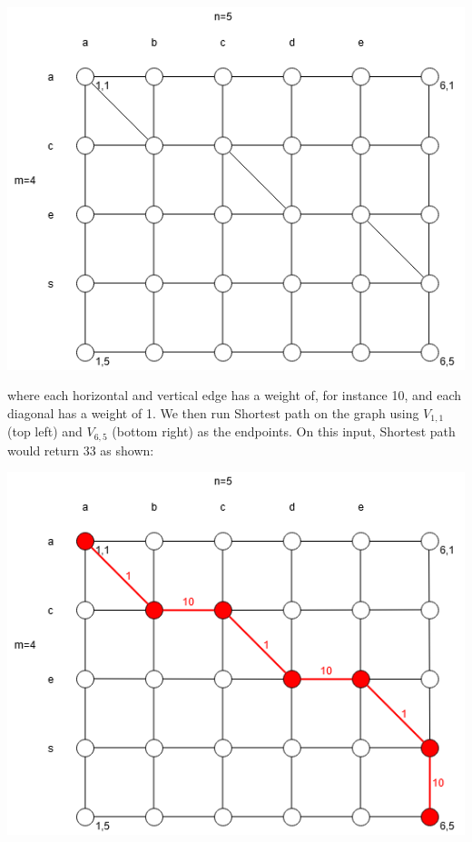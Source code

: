 \documentclass[a4paper]{article}
\begin{document}
\begin{center}
    \includegraphics[scale=.5]{hw13-1.png}
\end{center}

where each horizontal and vertical edge has a weight of, for instance 10, and each diagonal has a weight of 1. We then run Shortest path on the graph using $V_{1,1}$ (top left) and $V_{6,5}$ (bottom right) as the endpoints. On this input, Shortest path would return 33 as shown:

\begin{center}
    \includegraphics[scale=.5]{hw13-2.png}
\end{center}
\end{document}
